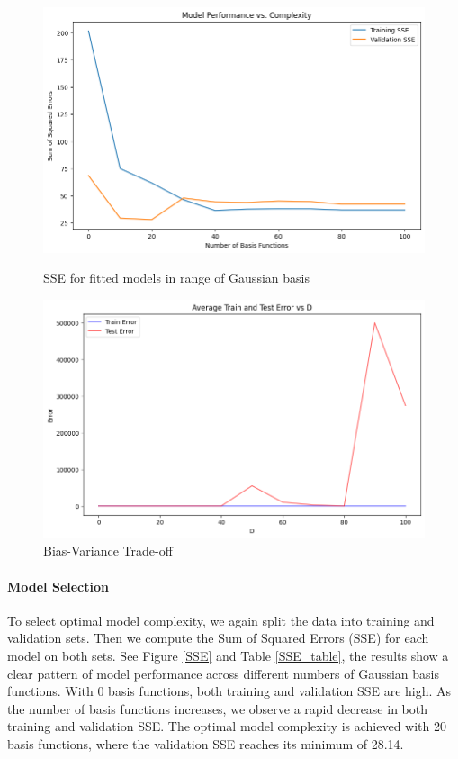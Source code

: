 \documentclass{article}
\begin{document}
\begin{figure}[H]
    \centering
    \begin{minipage}{0.45\textwidth}
        \centering
        \includegraphics[width=\linewidth]{figures/complexity.png} 
        \caption{SSE for fitted models in range of Gaussian basis}
        \label{SSE}
    \end{minipage}
    \centering
    \begin{minipage}{0.50\textwidth}
        \includegraphics[width=\linewidth]{figures/average_error.png} 
        \caption{Bias-Variance Trade-off}
        \label{error_compare}
\end{minipage}

\end{figure}
\paragraph{Model Selection}
To select optimal model complexity, we again split the data into training and validation sets. Then we compute the Sum of Squared Errors (SSE) for each model on both sets. See Figure \ref{SSE} and Table \ref{SSE_table}, the results show a clear pattern of model performance across different numbers of Gaussian basis functions. With 0 basis functions, both training and validation SSE are high. As the number of basis functions increases, we observe a rapid decrease in both training and validation SSE. The optimal model complexity is achieved with 20 basis functions, where the validation SSE reaches its minimum of 28.14.
\end{document}
